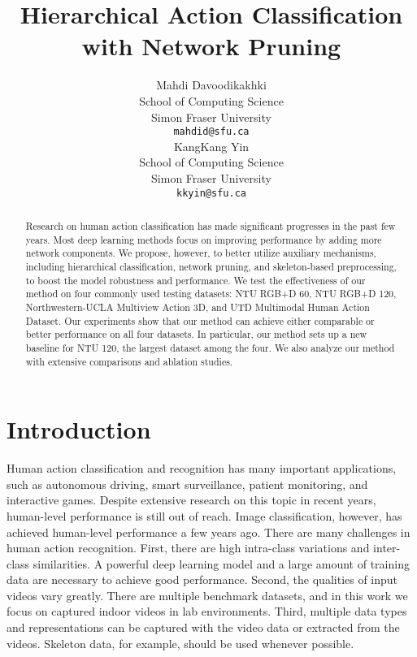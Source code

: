 \documentclass{article}
\title{Hierarchical Action Classification with Network Pruning}
\author{
  Mahdi Davoodikakhki\\
  School of Computing Science\\
  Simon Fraser University\\
  \texttt{mahdid@sfu.ca}\\
\And
 KangKang Yin \\
  School of Computing Science\\
  Simon Fraser University\\
  \texttt{kkyin@sfu.ca}\\
}
\begin{document}
\maketitle

\begin{abstract}
Research on human action classification has made significant progresses in the past few years. Most deep learning methods focus on improving performance by adding more network components. We propose, however, to better utilize auxiliary mechanisms, including hierarchical classification, network pruning, and skeleton-based preprocessing, to boost the model robustness and performance. We test the effectiveness of our method on four commonly used testing datasets: NTU RGB+D 60, NTU RGB+D 120, Northwestern-UCLA Multiview Action 3D, and UTD Multimodal Human Action Dataset. Our experiments show that our method can achieve either comparable or better performance on all four datasets. In particular, our method sets up a new baseline for NTU 120, the largest dataset among the four. We also analyze our method with extensive comparisons and ablation studies.
\end{abstract}




\section{Introduction}
{Human action classification and recognition has many important applications, such as autonomous driving, smart surveillance, patient monitoring, and interactive games. Despite extensive research on this topic in recent years, human-level performance is still out of reach. Image classification, however, has achieved human-level performance a few years ago. There are many challenges in human action recognition. First, there are high intra-class variations and inter-class similarities. A powerful deep learning model and a large amount of training data are necessary to achieve good performance. Second, the qualities of input videos vary greatly. There are multiple benchmark datasets, and in this work we focus on captured indoor videos in lab environments. Third, multiple data types and representations can be captured with the video data or extracted from the videos. Skeleton data, for example, should be used whenever possible.}
\end{document}
